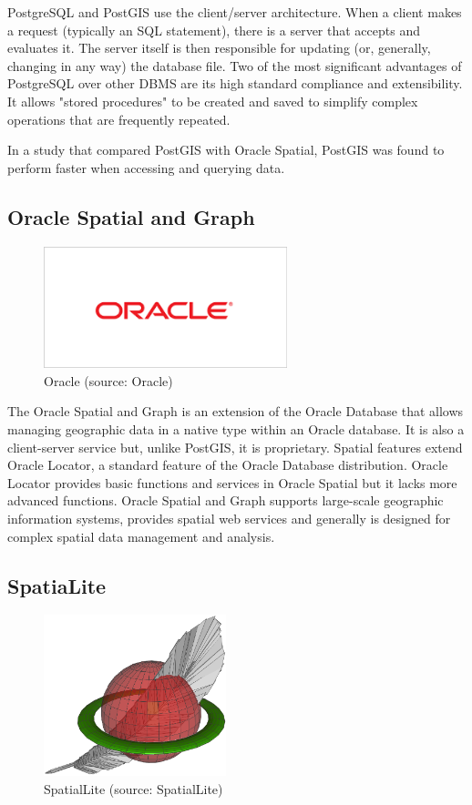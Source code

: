 PostgreSQL and PostGIS use the client/server architecture. When a client makes a request (typically an SQL statement), there is a server that accepts and evaluates it. The server itself is then responsible for updating (or, generally, changing in any way) the database file. Two of the most significant advantages of PostgreSQL over other DBMS are its high standard compliance and extensibility. It allows "stored procedures" to be created and saved to simplify complex operations that are frequently repeated. 

In a study that compared PostGIS with Oracle Spatial, PostGIS  was found to perform faster when accessing and querying data.\cite{postgis} 

	
\subsection{Oracle Spatial and Graph}

\begin{figure}[H] \centering
      \includegraphics[width=200pt]{./pictures/oracle.png}
      \caption[Oracle logo]{Oracle (source: Oracle)}
      \label{fig:Oracle}
  \end{figure}
  
  
The Oracle Spatial and Graph is an extension of the Oracle Database that allows managing geographic data in a native type within an Oracle database. It is also a client-server service but, unlike PostGIS, it is proprietary. Spatial features extend Oracle Locator, a standard feature of the Oracle Database distribution. Oracle Locator provides basic functions and services in Oracle Spatial but it lacks more advanced functions. Oracle Spatial and Graph supports large-scale geographic information systems, provides spatial web services and generally is designed for complex spatial data management and analysis.

\subsection{SpatiaLite}

\begin{figure}[H] \centering
      \includegraphics[width=150pt]{./pictures/spatialite.png}
      \caption[SpatialLite logo]{SpatialLite (source: SpatialLite)}
      \label{fig:SpatialLite}
  \end{figure}
  
